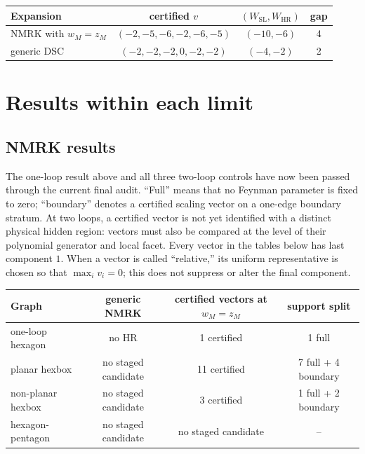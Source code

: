 \documentclass[11pt]{article}
\newcommand{\SL}{\mathrm{SL}}
\newcommand{\HR}{\mathrm{HR}}
\begin{document}
\begin{center}
\begin{tabular}{@{}lccc@{}}
\toprule
Expansion & certified \(v\) & \((W_{\SL},W_{\HR})\) & gap\\
\midrule
NMRK with \(w_M=z_M\) & \((-2,-5,-6,-2,-6,-5)\) & \((-10,-6)\) & 4\\
generic DSC & \((-2,-2,-2,0,-2,-2)\) & \((-4,-2)\) & 2\\
\bottomrule
\end{tabular}
\end{center}

\section{Results within each limit}

\subsection{NMRK results}

The one-loop result above and all three two-loop controls have now been
passed through the current final audit.  ``Full'' means that no Feynman
parameter is fixed to zero; ``boundary'' denotes a certified scaling vector
on a one-edge boundary stratum.  At two loops, a certified vector is not yet
identified with a distinct physical hidden region: vectors must also be
compared at the level of their polynomial generator and local facet.
Every vector in the tables below has last component \(1\).  When a vector is
called ``relative,'' its uniform representative is chosen so that
\(\max_i v_i=0\); this does not suppress or alter the final component.

\begin{center}
\begin{tabular}{@{}lccc@{}}
\toprule
Graph & generic NMRK & certified vectors at \(w_M=z_M\) & support split\\
\midrule
one-loop hexagon & no HR & 1 certified & 1 full\\
planar hexbox & no staged candidate & 11 certified & 7 full + 4 boundary\\
non-planar hexbox & no staged candidate & 3 certified & 1 full + 2 boundary\\
hexagon-pentagon & no staged candidate & no staged candidate & --\\
\bottomrule
\end{tabular}
\end{center}
\end{document}
